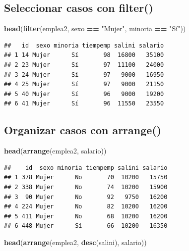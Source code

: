 \documentclass[]{book}
\newenvironment{Shaded}{\begin{snugshade}}{\end{snugshade}}
\newcommand{\KeywordTok}[1]{\textcolor[rgb]{0.13,0.29,0.53}{\textbf{#1}}}
\newcommand{\StringTok}[1]{\textcolor[rgb]{0.31,0.60,0.02}{#1}}
\newcommand{\OperatorTok}[1]{\textcolor[rgb]{0.81,0.36,0.00}{\textbf{#1}}}
\newcommand{\NormalTok}[1]{#1}
\begin{document}
\subsection{\texorpdfstring{Seleccionar casos con
\textbf{filter()}}{Seleccionar casos con filter()}}\label{seleccionar-casos-con-filter}

\begin{Shaded}
\begin{Highlighting}[]
\KeywordTok{head}\NormalTok{(}\KeywordTok{filter}\NormalTok{(emplea2, sexo }\OperatorTok{==}\StringTok{ "Mujer"}\NormalTok{, minoria }\OperatorTok{==}\StringTok{ "Sí"}\NormalTok{))}
\end{Highlighting}
\end{Shaded}

\begin{verbatim}
##   id  sexo minoria tiempemp salini salario
## 1 14 Mujer      Sí       98  16800   35100
## 2 23 Mujer      Sí       97  11100   24000
## 3 24 Mujer      Sí       97   9000   16950
## 4 25 Mujer      Sí       97   9000   21150
## 5 40 Mujer      Sí       96   9000   19200
## 6 41 Mujer      Sí       96  11550   23550
\end{verbatim}

\subsection{\texorpdfstring{Organizar casos con
\textbf{arrange()}}{Organizar casos con arrange()}}\label{organizar-casos-con-arrange}

\begin{Shaded}
\begin{Highlighting}[]
\KeywordTok{head}\NormalTok{(}\KeywordTok{arrange}\NormalTok{(emplea2, salario))}
\end{Highlighting}
\end{Shaded}

\begin{verbatim}
##    id  sexo minoria tiempemp salini salario
## 1 378 Mujer      No       70  10200   15750
## 2 338 Mujer      No       74  10200   15900
## 3  90 Mujer      No       92   9750   16200
## 4 224 Mujer      No       82  10200   16200
## 5 411 Mujer      No       68  10200   16200
## 6 448 Mujer      Sí       66  10200   16350
\end{verbatim}

\begin{Shaded}
\begin{Highlighting}[]
\KeywordTok{head}\NormalTok{(}\KeywordTok{arrange}\NormalTok{(emplea2, }\KeywordTok{desc}\NormalTok{(salini), salario))}
\end{Highlighting}
\end{Shaded}
\end{document}
